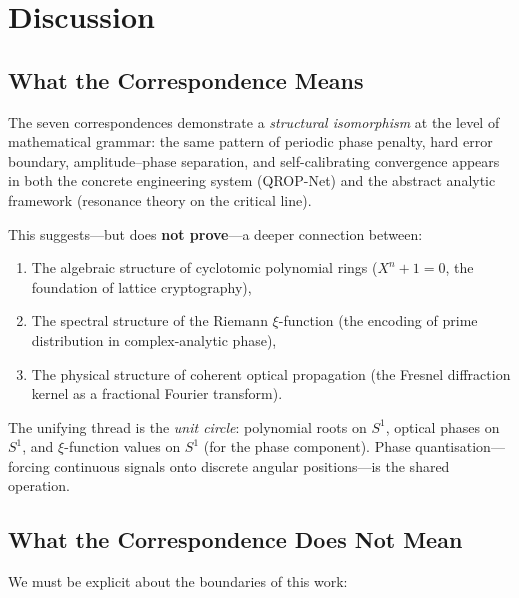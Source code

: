 \documentclass[11pt, a4paper]{article}
\theoremstyle{definition}
\theoremstyle{plain}
\newcommand{\xif}{\xi}                      %
\begin{document}
\section{Discussion}
\label{sec:discussion}

\subsection{What the Correspondence Means}

The seven correspondences demonstrate a \textit{structural isomorphism}
at the level of mathematical grammar: the same pattern of periodic
phase penalty, hard error boundary, amplitude--phase separation, and
self-calibrating convergence appears in both the concrete engineering
system (QROP-Net) and the abstract analytic framework (resonance theory
on the critical line).

This suggests---but does \textbf{not prove}---a deeper connection between:
\begin{enumerate}
  \item The algebraic structure of cyclotomic polynomial rings
        ($X^n + 1 = 0$, the foundation of lattice cryptography),
  \item The spectral structure of the Riemann $\xif$-function
        (the encoding of prime distribution in complex-analytic phase),
  \item The physical structure of coherent optical propagation
        (the Fresnel diffraction kernel as a fractional Fourier transform).
\end{enumerate}

The unifying thread is the \textit{unit circle}: polynomial roots on
$S^1$, optical phases on $S^1$, and $\xif$-function values on $S^1$
(for the phase component). Phase quantisation---forcing continuous
signals onto discrete angular positions---is the shared operation.


\subsection{What the Correspondence Does Not Mean}

We must be explicit about the boundaries of this work:
\end{document}
